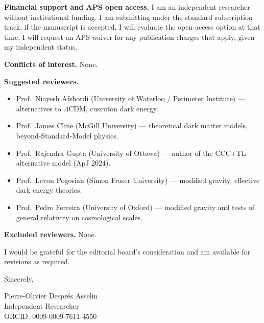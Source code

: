 \documentclass[12pt]{article}
\begin{document}
\bigskip

\textbf{Financial support and APS open access.}
I am an independent researcher without institutional funding.
I am submitting under the standard subscription track; if the
manuscript is accepted, I will evaluate the open-access option at
that time. I will request an APS waiver for any publication charges
that apply, given my independent status.

\bigskip

\textbf{Conflicts of interest.}
None.

\bigskip

\textbf{Suggested reviewers.}
\begin{itemize}
  \item Prof.\ Niayesh Afshordi (University of Waterloo / Perimeter
    Institute) --- alternatives to $\Lambda$CDM, cuscuton dark energy.
  \item Prof.\ James Cline (McGill University) --- theoretical dark
    matter models, beyond-Standard-Model physics.
  \item Prof.\ Rajendra Gupta (University of Ottawa) --- author of the
    CCC+TL alternative model (ApJ 2024).
  \item Prof.\ Levon Pogosian (Simon Fraser University) --- modified
    gravity, effective dark energy theories.
  \item Prof.\ Pedro Ferreira (University of Oxford) --- modified
    gravity and tests of general relativity on cosmological scales.
\end{itemize}

\bigskip

\textbf{Excluded reviewers.}
None.

\bigskip

I would be grateful for the editorial board's consideration and am
available for revisions as required.

\bigskip

Sincerely,

\bigskip

\noindent
Pierre-Olivier Despr\'{e}s Asselin \\
Independent Researcher \\
ORCID: 0009-0009-7611-4550
\end{document}
